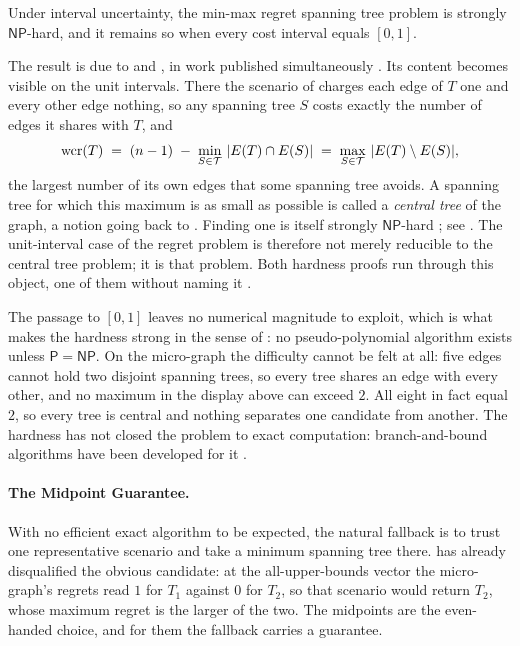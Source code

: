 \begin{theorem}\label{thm:regret-interval-hard}
Under interval uncertainty, the min-max regret spanning tree problem is strongly $\mathsf{NP}$-hard, and it remains so when every cost interval equals $[0,1]$.
\end{theorem}

The result is due to \textcite{AronVanHentenryck2004} and \textcite{AverbakhLebedev2004}, in work published simultaneously \cite[Theorem~8.16]{Goerigk2021RCO}.
Its content becomes visible on the unit intervals.
There the scenario of  charges each edge of $T$ one and every other edge nothing, so any spanning tree $S$ costs exactly the number of edges it shares with $T$, and
\[
\mathrm{wcr}(T) \;=\; (n - 1) \;-\; \min_{S \in \mathcal{T}}\, |E(T) \cap E(S)| \;=\; \max_{S \in \mathcal{T}}\, |E(T) \setminus E(S)|,
\]
the largest number of its own edges that some spanning tree avoids.
A spanning tree for which this maximum is as small as possible is called a \emph{\textcolor{RWTHBlue}{central tree}} of the graph, a notion going back to \textcite{Deo1966}.
Finding one is itself strongly $\mathsf{NP}$-hard \cite{BezrukovKaderaliPoguntke1996}; see \cite[Theorem~8.15]{Goerigk2021RCO}.
The unit-interval case of the regret problem is therefore not merely reducible to the central tree problem; it is that problem.
Both hardness proofs run through this object, one of them without naming it \cite[Section~8.2.2]{Goerigk2021RCO}.

The passage to $[0,1]$ leaves no numerical magnitude to exploit, which is what makes the hardness strong in the sense of : no pseudo-polynomial algorithm exists unless $\mathsf{P} = \mathsf{NP}$.
On the micro-graph the difficulty cannot be felt at all: five edges cannot hold two disjoint spanning trees, so every tree shares an edge with every other, and no maximum in the display above can exceed $2$.
All eight in fact equal $2$, so every tree is central and nothing separates one candidate from another.
The hardness has not closed the problem to exact computation: branch-and-bound algorithms have been developed for it \cite{MontemanniGambardella2005}.

\paragraph{The Midpoint Guarantee.}

With no efficient exact algorithm to be expected, the natural fallback is to trust one representative scenario and take a minimum spanning tree there.
 has already disqualified the obvious candidate: at the all-upper-bounds vector the micro-graph's regrets read $1$ for $T_1$ against $0$ for $T_2$, so that scenario would return $T_2$, whose maximum regret is the larger of the two.
The midpoints are the even-handed choice, and for them the fallback carries a guarantee.

